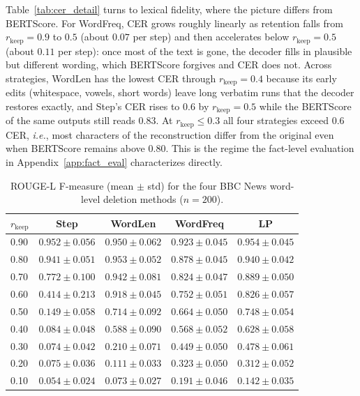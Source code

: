 \documentclass[11pt]{article}
\newcommand{\rkeep}{r_{\mathrm{keep}}}
\begin{document}
Table~\ref{tab:cer_detail} turns to lexical fidelity, where the picture differs from BERTScore. For
WordFreq, CER grows roughly linearly as retention falls from $\rkeep = 0.9$ to $0.5$ (about $0.07$ per
step) and then accelerates below $\rkeep = 0.5$ (about $0.11$ per step): once most of the text is gone,
the decoder fills in plausible but different wording, which BERTScore forgives and CER does not.
Across strategies, WordLen has the lowest CER through
$\rkeep = 0.4$ because its early edits (whitespace, vowels, short words) leave long verbatim runs that
the decoder restores exactly, and Step's CER rises to $0.6$ by $\rkeep = 0.5$ while the BERTScore of the same outputs still
reads $0.83$. At $\rkeep \le 0.3$ all four strategies exceed
$0.6$ CER, {\em i.e.}, most characters of the reconstruction differ from the original even when BERTScore
remains above $0.80$. This is the regime the fact-level evaluation in Appendix~\ref{app:fact_eval}
characterizes directly.

\begin{table}[tbp]
\centering
\small
\caption{ROUGE-L F-measure (mean $\pm$ std) for the four BBC News word-level deletion methods ($n{=}200$).}
\label{tab:rougel}
\begin{tabular}{lcccc}
\toprule
$\rkeep$ & Step & WordLen & WordFreq & LP \\
\midrule
0.90 & $0.952 \pm 0.056$ & $0.950 \pm 0.062$ & $0.923 \pm 0.045$ & $\mathbf{0.954 \pm 0.045}$ \\
0.80 & $0.941 \pm 0.051$ & $\mathbf{0.953 \pm 0.052}$ & $0.878 \pm 0.045$ & $0.940 \pm 0.042$ \\
0.70 & $0.772 \pm 0.100$ & $\mathbf{0.942 \pm 0.081}$ & $0.824 \pm 0.047$ & $0.889 \pm 0.050$ \\
0.60 & $0.414 \pm 0.213$ & $\mathbf{0.918 \pm 0.045}$ & $0.752 \pm 0.051$ & $0.826 \pm 0.057$ \\
0.50 & $0.149 \pm 0.058$ & $0.714 \pm 0.092$ & $0.664 \pm 0.050$ & $\mathbf{0.748 \pm 0.054}$ \\
0.40 & $0.084 \pm 0.048$ & $0.588 \pm 0.090$ & $0.568 \pm 0.052$ & $\mathbf{0.628 \pm 0.058}$ \\
0.30 & $0.074 \pm 0.042$ & $0.210 \pm 0.071$ & $0.449 \pm 0.050$ & $\mathbf{0.478 \pm 0.061}$ \\
0.20 & $0.075 \pm 0.036$ & $0.111 \pm 0.033$ & $\mathbf{0.323 \pm 0.050}$ & $0.312 \pm 0.052$ \\
0.10 & $0.054 \pm 0.024$ & $0.073 \pm 0.027$ & $\mathbf{0.191 \pm 0.046}$ & $0.142 \pm 0.035$ \\
\bottomrule
\end{tabular}
\end{table}
\end{document}
